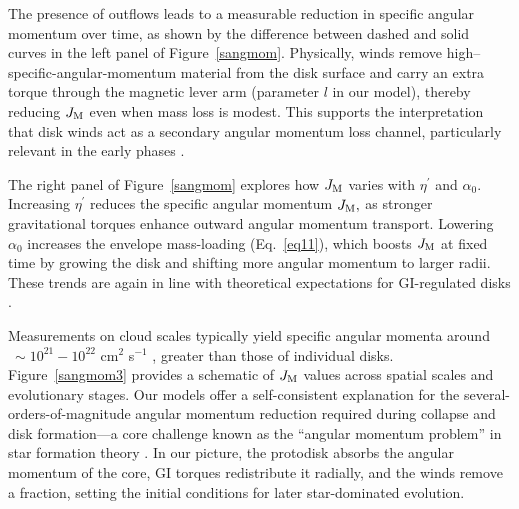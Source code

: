 \documentclass[twocolumn,linenumbers]{aastex631}
\begin{document}

The presence of outflows leads to a measurable reduction in specific angular momentum over time, as shown by the difference between dashed and solid curves in the left panel of Figure~\ref{sangmom}. Physically, winds remove high–specific-angular-momentum material from the disk surface and carry an extra torque through the magnetic lever arm (parameter $l$ in our model), thereby reducing $J_{\rm M}$ even when mass loss is modest. This supports the interpretation that disk winds act as a secondary angular momentum loss channel, particularly relevant in the early phases \citep{lebreuilly2024influence}.

The right panel of Figure~\ref{sangmom} explores how $J_{\rm M}$ varies with $\eta^{\prime}$ and $\alpha_0$. Increasing $\eta^{\prime}$ reduces the specific angular momentum $J_{\rm M},$ as stronger gravitational torques enhance outward angular momentum transport. Lowering $\alpha_{0}$ increases the envelope mass-loading (Eq.~\ref{eq11}), which boosts $J_{\rm M}$ at fixed time by growing the disk and shifting more angular momentum to larger radii. These trends are again in line with theoretical expectations for GI-regulated disks \citep{lin1987grav, kratter2008formation}.

Measurements on cloud scales typically yield specific angular momenta around $~ \sim 10^{21} - 10^{22}$ cm$^2$ s$^{-1}$ \citep{goodman1993dense}, greater than those of individual disks. Figure~\ref{sangmom3} provides a schematic of $J_{\rm M}$ values across spatial scales and evolutionary stages. Our models offer a self-consistent explanation for the several-orders-of-magnitude angular momentum reduction required during collapse and disk formation—a core challenge known as the ``angular momentum problem” in star formation theory \citep{spitzer2008physical, maeder2004stellar}. In our picture, the protodisk absorbs the angular momentum of the core, GI torques redistribute it radially, and the winds remove a fraction, setting the initial conditions for later star-dominated evolution.
\end{document}
